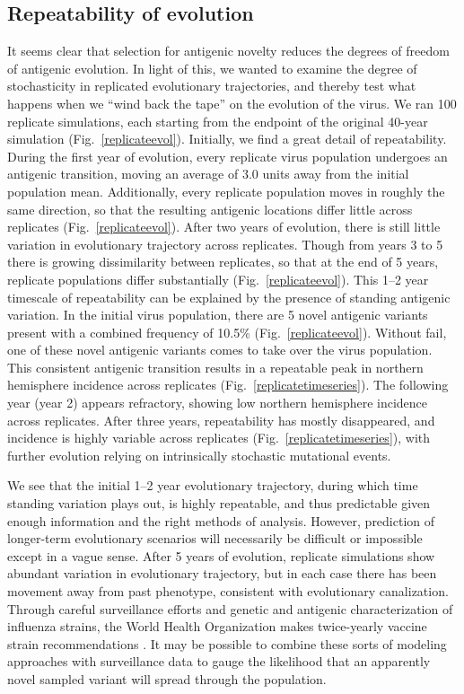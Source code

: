 \documentclass[11pt,oneside,letterpaper]{article}
\begin{document}
\subsection*{Repeatability of evolution}

It seems clear that selection for antigenic novelty reduces the degrees of freedom of antigenic evolution.  In light of this, we wanted to examine the degree of stochasticity in replicated evolutionary trajectories, and thereby test what happens when we ``wind back the tape'' \cite{GouldWonderfulLife} on the evolution of the virus.  We ran 100 replicate simulations, each starting from the endpoint of the original 40-year simulation (Fig.~\ref{replicateevol}).  Initially, we find a great detail of repeatability.  During the first year of evolution, every replicate virus population undergoes an antigenic transition, moving an average of 3.0 units away from the initial population mean.  Additionally, every replicate population moves in roughly the same direction, so that the resulting antigenic locations differ little across replicates (Fig.~\ref{replicateevol}).  After two years of evolution, there is still little variation in evolutionary trajectory across replicates.  Though from years 3 to 5 there is growing dissimilarity between replicates, so that at the end of 5 years, replicate populations differ substantially (Fig.~\ref{replicateevol}).  This 1--2 year timescale of repeatability can be explained by the presence of standing antigenic variation.  In the initial virus population, there are 5 novel antigenic variants present with a combined frequency of 10.5\% (Fig.~\ref{replicateevol}).  Without fail, one of these novel antigenic variants comes to take over the virus population.  This consistent antigenic transition results in a repeatable peak in northern hemisphere incidence across replicates (Fig.~\ref{replicatetimeseries}).  The following year (year 2) appears refractory, showing low northern hemisphere incidence across replicates.  After three years, repeatability has mostly disappeared, and incidence is highly variable across replicates (Fig.~\ref{replicatetimeseries}), with further evolution relying on intrinsically stochastic mutational events.

We see that the initial 1--2 year evolutionary trajectory, during which time standing variation plays out, is highly repeatable, and thus predictable given enough information and the right methods of analysis.  However, prediction of longer-term evolutionary scenarios will necessarily be difficult or impossible except in a vague sense.  After 5 years of evolution, replicate simulations show abundant variation in evolutionary trajectory, but in each case there has been movement away from past phenotype, consistent with evolutionary canalization.  Through careful surveillance efforts and genetic and antigenic characterization of influenza strains, the World Health Organization makes twice-yearly vaccine strain recommendations \cite{Barr10}.  It may be possible to combine these sorts of modeling approaches with surveillance data to gauge the likelihood that an apparently novel sampled variant will spread through the population.
\end{document}
